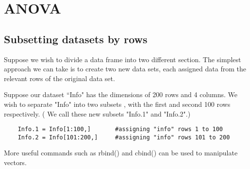 \documentclass[a4paper,12pt]{article}
\begin{document}
	\section{ANOVA}
	
	
	\newpage
	
	
	
	
	
	\subsection{Subsetting datasets by rows}
	
	Suppose we wish to divide a data frame into two different section. The simplest approach we can take is to create two new data sets, each assigned data from the relevant rows of the original data set.
	
	Suppose our dataset ``Info" has the dimensions of 200 rows and 4 columns. We wish to separate "Info" into two subsets , with the first and second 100 rows respectively. ( We call these new subsets "Info.1" and "Info.2".)
	\begin{verbatim}
	Info.1 = Info[1:100,]		#assigning "info" rows 1 to 100
	Info.2 = Info[101:200,]		#assigning "info" rows 101 to 200
	\end{verbatim}
	
	More useful commands such as rbind() and cbind()  can be used to manipulate vectors.
	
\end{document}
